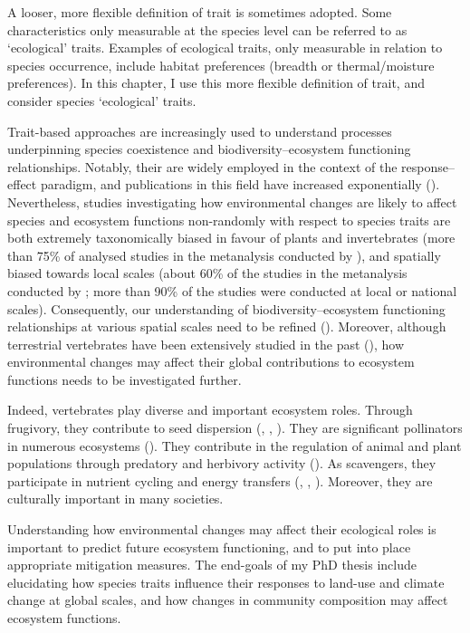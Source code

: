 A looser, more flexible definition of trait is sometimes adopted. Some characteristics only measurable at the species level can be referred to as `ecological' traits. Examples of ecological traits, only measurable in relation to species occurrence, include habitat preferences (breadth or thermal/moisture preferences). In this chapter, I use this more flexible definition of trait, and consider species `ecological' traits.

Trait-based approaches are increasingly used to understand processes underpinning species coexistence and biodiversity--ecosystem functioning relationships. Notably, their are widely employed in the context of the response--effect paradigm, and publications in this field have increased exponentially (\cite{Hevia2017}). Nevertheless, studies investigating how environmental changes are likely to affect species and ecosystem functions non-randomly with respect to species traits are both extremely taxonomically biased in favour of plants and invertebrates (more than 75\% of analysed studies in the metanalysis conducted by \cite{Hevia2017}), and spatially biased towards local scales (about 60\% of the studies in the metanalysis conducted by \cite{Hevia2017}; more than 90\% of the studies were conducted at local or national scales). Consequently, our understanding of biodiversity--ecosystem functioning relationships at various spatial scales need to be refined (\cite{Thompson2018}). Moreover, although terrestrial vertebrates have been extensively studied in the past (\cite{Titley2017}), how environmental changes may affect their global contributions to ecosystem functions needs to be investigated further. 

Indeed, vertebrates play diverse and important ecosystem roles. Through frugivory, they  contribute to seed dispersion (\cite{Wandrag2015}, \cite{Mokany2014}, \cite{McConkey2012}). They are significant pollinators in numerous ecosystems (\cite{Ratto2018}). They contribute in the regulation of animal and plant populations through predatory and herbivory activity (\cite{Luck2012}). As scavengers, they participate in nutrient cycling and energy transfers (\cite{Cunningham2018}, \cite{Inger2016}, \cite{Wilson2011}). Moreover, they are culturally important in many societies.

Understanding how environmental changes may affect their ecological roles is important to predict future ecosystem functioning, and to put into place appropriate mitigation measures. The end-goals of my PhD thesis include elucidating how species traits influence their responses to land-use and climate change at global scales, and how changes in community composition may affect ecosystem functions.

